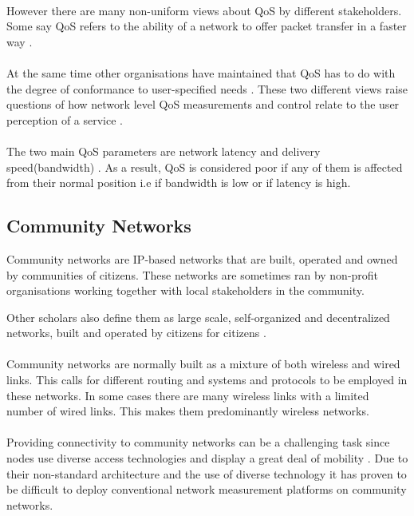 \paragraph{}
However there are many non-uniform views about QoS by different stakeholders. Some say QoS refers to the ability of a network to offer packet transfer in a faster way \cite{5430142}.
\paragraph{}
At the same time other organisations have maintained that QoS has to do with the degree of conformance to user-specified needs \cite{article}. These two different views raise questions of how network level QoS measurements and control relate to the user perception of a service \cite{5430142}.
\paragraph{}
The two main QoS parameters are network latency
and delivery speed(bandwidth) \cite{5430142}. As a result, QoS is considered poor if any of them is affected from their normal position i.e if bandwidth is low or if latency is high.
\subsection{Community Networks}
Community networks are IP-based networks that are built, operated and owned by communities of citizens. These networks are sometimes ran by non-profit organisations working together with local stakeholders in the community\cite{alma990000517660904041}.

Other scholars also define them as large scale, self-organized and decentralized networks, built and operated by citizens for citizens \cite{Braem:2013:CRC:2500098.2500108}.
\paragraph{}
Community networks are normally built as a mixture of both wireless and wired links. This calls for different routing and systems and protocols to be employed in these networks. In some cases there are many wireless links with a limited number of wired links. This makes them predominantly wireless networks\cite{alma990000517660904041}.
\paragraph{}
Providing connectivity to community networks can be a challenging task since nodes use diverse access technologies and display a great deal of mobility \cite{Plagemann2008}.
Due to their non-standard architecture and the use of diverse technology it has proven to be difficult to deploy conventional network measurement platforms on community networks.



